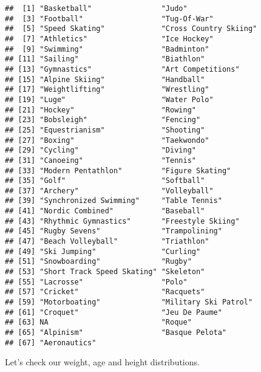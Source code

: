 \documentclass[
]{article}
\newenvironment{Shaded}{\begin{snugshade}}{\end{snugshade}}
\newcommand{\AttributeTok}[1]{\textcolor[rgb]{0.77,0.63,0.00}{#1}}
\newcommand{\FunctionTok}[1]{\textcolor[rgb]{0.00,0.00,0.00}{#1}}
\newcommand{\NormalTok}[1]{#1}
\newcommand{\SpecialCharTok}[1]{\textcolor[rgb]{0.00,0.00,0.00}{#1}}
\begin{document}
\begin{verbatim}
##  [1] "Basketball"                "Judo"                     
##  [3] "Football"                  "Tug-Of-War"               
##  [5] "Speed Skating"             "Cross Country Skiing"     
##  [7] "Athletics"                 "Ice Hockey"               
##  [9] "Swimming"                  "Badminton"                
## [11] "Sailing"                   "Biathlon"                 
## [13] "Gymnastics"                "Art Competitions"         
## [15] "Alpine Skiing"             "Handball"                 
## [17] "Weightlifting"             "Wrestling"                
## [19] "Luge"                      "Water Polo"               
## [21] "Hockey"                    "Rowing"                   
## [23] "Bobsleigh"                 "Fencing"                  
## [25] "Equestrianism"             "Shooting"                 
## [27] "Boxing"                    "Taekwondo"                
## [29] "Cycling"                   "Diving"                   
## [31] "Canoeing"                  "Tennis"                   
## [33] "Modern Pentathlon"         "Figure Skating"           
## [35] "Golf"                      "Softball"                 
## [37] "Archery"                   "Volleyball"               
## [39] "Synchronized Swimming"     "Table Tennis"             
## [41] "Nordic Combined"           "Baseball"                 
## [43] "Rhythmic Gymnastics"       "Freestyle Skiing"         
## [45] "Rugby Sevens"              "Trampolining"             
## [47] "Beach Volleyball"          "Triathlon"                
## [49] "Ski Jumping"               "Curling"                  
## [51] "Snowboarding"              "Rugby"                    
## [53] "Short Track Speed Skating" "Skeleton"                 
## [55] "Lacrosse"                  "Polo"                     
## [57] "Cricket"                   "Racquets"                 
## [59] "Motorboating"              "Military Ski Patrol"      
## [61] "Croquet"                   "Jeu De Paume"             
## [63] NA                          "Roque"                    
## [65] "Alpinism"                  "Basque Pelota"            
## [67] "Aeronautics"
\end{verbatim}

Let's check our weight, age and height distributions.

\begin{Shaded}
\end{Shaded}
\end{document}
